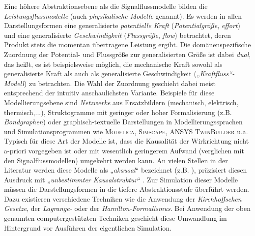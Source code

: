 Eine höhere Abstraktionsebene als die Signalflussmodelle bilden die \emph{Leistungsflussmodelle} (auch \emph{physikalische Modelle} genannt). Es werden in allen Darstellungsformen eine generalisierte \emph{potentielle Kraft} (\emph{Potentialgröße}, \emph{effort}) und eine generalisierte \emph{Geschwindigkeit} (\emph{Flussgröße}, \emph{flow}) betrachtet, deren Produkt stets die momentan übertragene Leistung ergibt. Die domänenspezifische Zuordnung der Potential- und Flussgröße zur generalisierten Größe ist dabei \emph{dual}, das heißt, es ist beispielsweise möglich, die mechanische Kraft sowohl als generalisierte Kraft als auch als generalisierte Geschwindigkeit (\emph{„Kraftfluss“-Modell}) zu betrachten. Die Wahl der Zuordnung geschieht dabei meist entsprechend der intuitiv anschaulichsten Variante. Beispiele für diese Modellierungsebene sind \emph{Netzwerke} aus Ersatzbildern (mechanisch, elektrisch, thermisch,...), Struktogramme mit geringer oder hoher Formalisierung (z.B. \emph{Bondgraphen}) oder graphisch-textuelle Darstellungen in Modellierungssprachen und Simulationsprogrammen wie \textsc{Modelica}, \textsc{Simscape}, \textsc{ANSYS TwinBuilder} u.a. Typisch für diese Art der Modelle ist, dass die Kausalität der Wirkrichtung nicht a-priori vorgegeben ist oder mit wesentlich geringerem Aufwand (verglichen mit den Signalflussmodellen) umgekehrt werden kann. An vielen Stellen in der Literatur werden diese Modelle als „\emph{akausal}“ bezeichnet (z.B.  \cites{gesenhuesObjektorientiertmodellbasierteCharakterisierungUberwachung2019,schmittMethodenZurModellbildung2019,richterEinsatzVirtuellerPrototypen2013}), \citeauthor{janschekSystementwurfMechatronischerSysteme2010} präzisiert diesen Ausdruck mit „\emph{unbestimmter Kausalstruktur}“ \cite[S.~118]{janschekSystementwurfMechatronischerSysteme2010}. Zur Simulation dieser Modelle müssen die Darstellungsformen in die tiefere Abstraktionsstufe überführt werden. Dazu existieren verschiedene Techniken wie die Anwendung der \emph{Kirchhoffschen Gesetze}, der \emph{Lagrange-} oder der \emph{Hamilton-Formalismus}. Bei Anwendung der oben genannten computergestützten Techniken geschieht diese Umwandlung im Hintergrund vor Ausführen der eigentlichen Simulation. 

